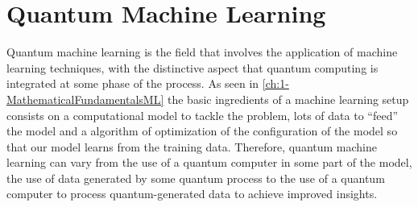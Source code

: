 
\chapter{Quantum Machine Learning}\label{ch:3-QML}


Quantum machine learning is the field that involves the application of machine learning techniques, with the distinctive aspect that quantum computing is integrated at some phase of the process. As seen in \autoref{ch:1-MathematicalFundamentalsML} the basic ingredients of a machine learning setup consists on a computational model to tackle the problem, lots of data to ``feed'' the model and a algorithm of optimization of the configuration of the model so that our model learns from the training data. Therefore, quantum machine learning can vary from the use of a quantum computer in some part of the model, the use of data generated by some quantum process to the use of a quantum computer to process quantum-generated data to achieve improved insights.


